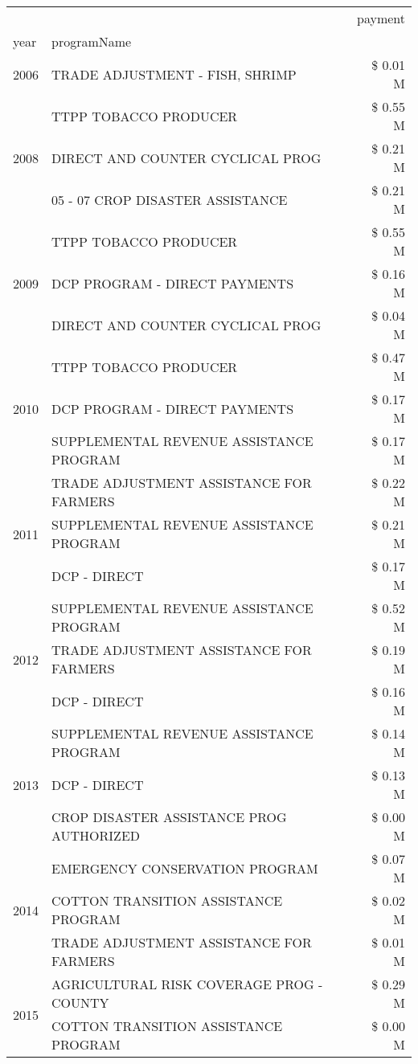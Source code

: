 \begin{tabular}{llr}
\toprule
 &  & payment \\
year & programName &  \\
\midrule
2006 & TRADE ADJUSTMENT - FISH, SHRIMP & \$ 0.01 M \\
\cline{1-3}
\multirow[t]{3}{*}{2008} & TTPP TOBACCO PRODUCER & \$ 0.55 M \\
 & DIRECT AND COUNTER CYCLICAL PROG & \$ 0.21 M \\
 & 05 - 07 CROP DISASTER ASSISTANCE & \$ 0.21 M \\
\cline{1-3}
\multirow[t]{3}{*}{2009} & TTPP TOBACCO PRODUCER & \$ 0.55 M \\
 & DCP PROGRAM - DIRECT PAYMENTS & \$ 0.16 M \\
 & DIRECT AND COUNTER CYCLICAL PROG & \$ 0.04 M \\
\cline{1-3}
\multirow[t]{3}{*}{2010} & TTPP TOBACCO PRODUCER & \$ 0.47 M \\
 & DCP PROGRAM - DIRECT PAYMENTS & \$ 0.17 M \\
 & SUPPLEMENTAL REVENUE ASSISTANCE PROGRAM & \$ 0.17 M \\
\cline{1-3}
\multirow[t]{3}{*}{2011} & TRADE ADJUSTMENT ASSISTANCE FOR FARMERS & \$ 0.22 M \\
 & SUPPLEMENTAL REVENUE ASSISTANCE PROGRAM & \$ 0.21 M \\
 & DCP - DIRECT & \$ 0.17 M \\
\cline{1-3}
\multirow[t]{3}{*}{2012} & SUPPLEMENTAL REVENUE ASSISTANCE PROGRAM & \$ 0.52 M \\
 & TRADE ADJUSTMENT ASSISTANCE FOR FARMERS & \$ 0.19 M \\
 & DCP - DIRECT & \$ 0.16 M \\
\cline{1-3}
\multirow[t]{3}{*}{2013} & SUPPLEMENTAL REVENUE ASSISTANCE PROGRAM & \$ 0.14 M \\
 & DCP - DIRECT & \$ 0.13 M \\
 & CROP DISASTER ASSISTANCE PROG AUTHORIZED & \$ 0.00 M \\
\cline{1-3}
\multirow[t]{3}{*}{2014} & EMERGENCY CONSERVATION PROGRAM & \$ 0.07 M \\
 & COTTON TRANSITION ASSISTANCE PROGRAM & \$ 0.02 M \\
 & TRADE ADJUSTMENT ASSISTANCE FOR FARMERS & \$ 0.01 M \\
\cline{1-3}
\multirow[t]{2}{*}{2015} & AGRICULTURAL RISK COVERAGE PROG - COUNTY & \$ 0.29 M \\
 & COTTON TRANSITION ASSISTANCE PROGRAM & \$ 0.00 M \\

\end{tabular}
